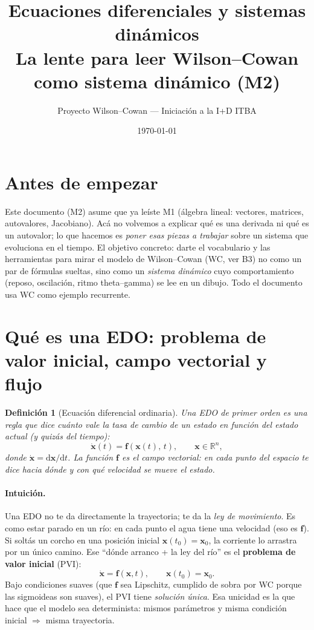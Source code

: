 \documentclass[11pt,a4paper]{article}
\title{\textbf{Ecuaciones diferenciales y sistemas dinámicos}\\[2pt]\large La lente para leer Wilson--Cowan como sistema dinámico (M2)}
\author{Proyecto Wilson--Cowan --- Iniciación a la I+D ITBA}
\date{\today}
\newtheorem{definition}{Definición}
\newcommand{\R}{\mathbb{R}}
\begin{document}
\maketitle
\tableofcontents
\bigskip

\section*{Antes de empezar}
Este documento (M2) asume que ya leíste M1 (álgebra lineal: vectores, matrices, autovalores, Jacobiano). Acá no volvemos a explicar qué es una derivada ni qué es un autovalor; lo que hacemos es \emph{poner esas piezas a trabajar} sobre un sistema que evoluciona en el tiempo. El objetivo concreto: darte el vocabulario y las herramientas para mirar el modelo de Wilson--Cowan (WC, ver B3) no como un par de fórmulas sueltas, sino como un \emph{sistema dinámico} cuyo comportamiento (reposo, oscilación, ritmo theta--gamma) se lee en un dibujo. Todo el documento usa WC como ejemplo recurrente.

\section{Qué es una EDO: problema de valor inicial, campo vectorial y flujo}

\begin{definition}[Ecuación diferencial ordinaria]
Una EDO de primer orden es una regla que dice cuánto vale la \emph{tasa de cambio} de un estado en función del estado actual (y quizás del tiempo):
\begin{equation}
\dot{\mathbf{x}}(t) = \mathbf{f}(\mathbf{x}(t),\,t), \qquad \mathbf{x}\in\R^n,
\end{equation}
donde $\dot{\mathbf{x}} = \mathrm{d}\mathbf{x}/\mathrm{d}t$. La función $\mathbf{f}$ es el \emph{campo vectorial}: en cada punto del espacio te dice hacia dónde y con qué velocidad se mueve el estado.
\end{definition}

\paragraph{Intuición.} Una EDO no te da directamente la trayectoria; te da la \emph{ley de movimiento}. Es como estar parado en un río: en cada punto el agua tiene una velocidad (eso es $\mathbf{f}$). Si soltás un corcho en una posición inicial $\mathbf{x}(t_0)=\mathbf{x}_0$, la corriente lo arrastra por un único camino. Ese ``dónde arranco + la ley del río'' es el \textbf{problema de valor inicial} (PVI):
\begin{equation}
\dot{\mathbf{x}} = \mathbf{f}(\mathbf{x},t), \qquad \mathbf{x}(t_0)=\mathbf{x}_0.
\end{equation}
Bajo condiciones suaves (que $\mathbf{f}$ sea Lipschitz, cumplido de sobra por WC porque las sigmoideas son suaves), el PVI tiene \emph{solución única}. Esa unicidad es la que hace que el modelo sea determinista: mismos parámetros y misma condición inicial $\Rightarrow$ misma trayectoria.
\end{document}
